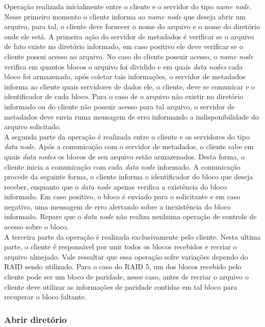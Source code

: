 Operação realizada inicialmente entre o cliente e o servidor do tipo \textit{name node}. Nesse primeiro momento o cliente informa ao \textit{name node} que deseja abrir um arquivo, para tal, o cliente deve fornecer o nome do arquivo e o nome do diretório onde ele está. A primeira ação do servidor de metadados é verificar se o arquivo de fato existe no diretório informado, em caso positivo ele deve verificar se o cliente possui acesso ao arquivo. No caso do cliente possuir acesso, o \textit{name node} verifica em quantos blocos o arquivo foi dividido e em quais \textit{data nodes} cada bloco foi armazenado, após coletar tais informações, o servidor de metadados informa ao cliente quais servidores de dados ele, o cliente, deve se comunicar e o identificador de cada bloco. Para o caso de o arquivo não existir no diretório informado ou do cliente não possuir acesso para tal arquivo, o servidor de metadados deve envia ruma mensagem de erro informando a indisponibilidade do arquivo solicitado. 
\\

A segunda parte da operação é realizada entre o cliente e os servidores do tipo \textit{data node}. Após a comunicação com o servidor de metadados, o cliente sabe em quais \textit{data nodes} os blocos de seu arquivo estão armazenados. Desta forma, o cliente inicia a comunicação com cada \textit{data node} informado. A comunicação procede da seguinte forma, o cliente informa o identificador do bloco que deseja receber, enquanto que o \textit{data node} apenas verifica a existência do bloco informado. Em caso positivo, o bloco é enviado para o solicitante e em caso negativo, uma mensagem de erro alertando sobre a inexistência do bloco informado. Repare que o \textit{data node} não realiza nenhuma operação de controle de acesso sobre o bloco.
\\

A terceira parte da operação é realizada exclusivamente pelo cliente. Nesta ultima parte, o cliente é responsável por unir todos os blocos recebidos e recriar o arquivo almejado.  Vale ressaltar que essa operação sofre variações dependo do RAID sendo utilizado. Para o caso do RAID 5, um dos blocos recebido pelo cliente pode ser um bloco de paridade, nesse caso, antes de recriar o arquivo o cliente deve utilizar as informações de paridade contidas em tal bloco para recuperar o bloco faltante.
\\

\subsubsection{Abrir diretório}

